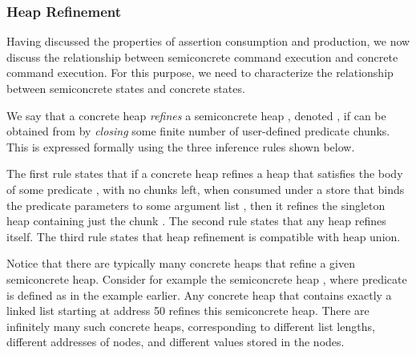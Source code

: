 \documentclass{CSML}
\newcommand{\display}[1]{}
\newcommand{\llbrace}{\{\hspace{-3pt}[}
\newcommand{\rrbrace}{]\hspace{-3pt}\}}
\theoremstyle{definition}\newtheorem{notation}[thm]{Notation}
\theoremstyle{plain}\newtheorem{satz}[thm]{Satz}
\begin{document}
\begin{defi}[Modifies]





\end{defi}

\begin{lem}
\display{\mathsf{modifies}_{\mathsf{targets}(c)}\;\mathsf{scexec}(c)}
\end{lem}

\subsubsection{Heap Refinement}

Having discussed the properties of assertion consumption and production, 
we now discuss the relationship between semiconcrete command execution and 
concrete command execution. For this purpose, we need to characterize the 
relationship between semiconcrete states and concrete states. 

We say that a concrete heap  \emph{refines} a semiconcrete 
heap , denoted , if  can be obtained 
from  by \emph{closing} some finite number of user-defined 
predicate chunks. This is expressed formally using the three inference 
rules shown below. 
\begin{defi}
\end{defi}
The first rule states that if a concrete heap 
 refines a heap  that satisfies the body  of some 
predicate , with no chunks left, when consumed under a store that binds 
the predicate parameters  to some argument list 
, then it refines the singleton heap containing just the 
chunk . The second rule states that any heap refines 
itself. The third rule states that heap refinement is compatible with heap 
union.

Notice that there are typically many concrete heaps that refine a given 
semiconcrete heap. Consider for example the semiconcrete heap , where predicate  is defined as 
in the example earlier. Any concrete heap that contains exactly a linked 
list starting at address 50 refines this semiconcrete heap. There are 
infinitely many such concrete heaps, corresponding to different list 
lengths, different addresses of nodes, and different values stored in the 
nodes.
\end{document}
